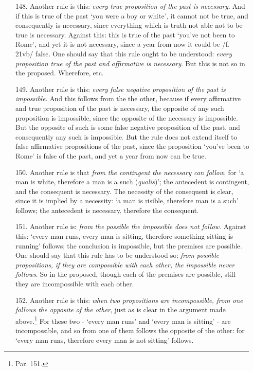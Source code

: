 \begin{itemize}
\item[148.] Another rule is this: \textit{every true proposition of the past is necessary}. And if this is true of the past `you were a boy or white', it cannot not be true, and consequently is necessary, since everything which is truth not able not to be true is necessary. Against this: this is true of the past `you've not been to Rome', and yet it is not necessary, since a year from now it could be /f. 21vb/ false. One should say that this rule ought to be understood: \textit{every proposition true of the past and affirmative is necessary}. But this is not so in the proposed. Wherefore, etc.
\item[149.] Another rule is this: \textit{every false negative proposition of the past is impossible}. And this follows from the the other, because if every affirmative and true proposition of the past is necessary, the opposite of any such proposition is impossible, since the opposite of the necessary is impossible. But the opposite of such is some false negative proposition of the past, and consequently any such is impossible. But the rule does not extend itself to false affirmative propositions of the past, since the proposition `you've been to Rome' is false of the past, and yet a year from now can be true. 
\item[150.] Another rule is that \textit{from the contingent the necessary can follow}, for `a man is white, therefore a man is a such (\textit{qualis})'; the antecedent is contingent, and the consequent is necessary. The necessity of the consequent is clear, since it is implied by a necessity: `a man is risible, therefore man is a such' follows; the antecedent is necessary, therefore the consequent.
\item[151.] Another rule is: \textit{from the possible the impossible does not follow}. Against this: `every man runs, every man is sitting, therefore something sitting is running' follows; the conclusion is impossible, but the premises are possible. One should say that this rule has to be understood so: \textit{from possible propositions, if they are compossible with each other, the impossible never follows}. So in the proposed, though each of the premises are possible, still they are incompossible with each other.
\item[152.] Another rule is this: \textit{when two propositions are incompossible, from one follows the opposite of the other}, just as is clear in the argument made above.\footnote{Par. 151.} For these two - `every man runs' and `every man is sitting' - are incompossible, and so from one of them follows the opposite of the other: for `every man runs, therefore every man is not sitting' follows.

\end{itemize}

